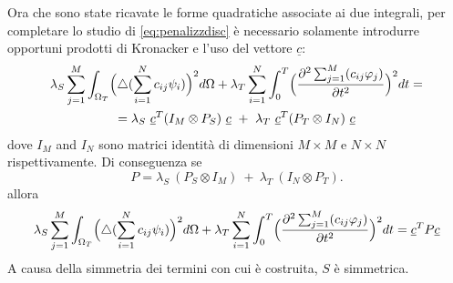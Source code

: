 \documentclass[a4paper,11pt,twoside,openright]{book}							%
\begin{document}
Ora che sono state ricavate le forme quadratiche associate ai due integrali, per completare lo studio di \ref{eq:penalizzdisc} è necessario solamente introdurre opportuni prodotti di Kronacker e l'uso del vettore $\underline c$:
\begin{multline*}
\lambda_S  \sum_{j=1}^M \int_{\Omega_T} \Bigl( \triangle(\sum_{i=1}^N  c_{ij}\psi_i ) \Bigr)^2 d \Omega + \lambda_T \sum_{i=1}^N\int_0^T \Bigl( \frac{\partial^2 \sum_{j=1}^M(c_{ij}\varphi_j) }{\partial t ^2} \Bigr)^2 dt= \\
= \lambda_S\   \underline c^T (I_M \otimes P_S)\  \underline c   \ +\  \lambda_T\  \underline c^T ( P_T \otimes I_N)\  \underline c
\end{multline*}
dove $I_M$ and $I_N$ sono matrici identità di dimensioni $M \times M$ e $N \times N$ rispettivamente.
Di conseguenza se
$$ P = \lambda_S\    (P_S \otimes I_M)   \ +\  \lambda_T\   (I_N \otimes P_T)  .$$
allora
$$
\lambda_S  \sum_{j=1}^M \int_{\Omega_T} \Bigl( \triangle(\sum_{i=1}^N  c_{ij}\psi_i ) \Bigr)^2 d \Omega + \lambda_T \sum_{i=1}^N\int_0^T \Bigl( \frac{\partial^2 \sum_{j=1}^M(c_{ij}\varphi_j) }{\partial t ^2} \Bigr)^2 dt=\underline c^T P \underline c
$$
A causa della simmetria dei termini con cui è costruita, $S$ è simmetrica.
\end{document}
